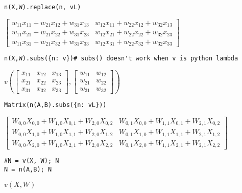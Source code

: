 \documentclass[
]{article}
\begin{document}
\begin{verbatim}
n(X,W).replace(n, vL)
\end{verbatim}

\(\displaystyle \left[\begin{matrix}w_{11} x_{11} + w_{21} x_{12} + w_{31} x_{13} & w_{12} x_{11} + w_{22} x_{12} + w_{32} x_{13}\\w_{11} x_{21} + w_{21} x_{22} + w_{31} x_{23} & w_{12} x_{21} + w_{22} x_{22} + w_{32} x_{23}\\w_{11} x_{31} + w_{21} x_{32} + w_{31} x_{33} & w_{12} x_{31} + w_{22} x_{32} + w_{32} x_{33}\end{matrix}\right]\)

\begin{verbatim}
n(X,W).subs({n: v})# subs() doesn't work when v is python lambda
\end{verbatim}

\(\displaystyle v{\left(\left[\begin{matrix}x_{11} & x_{12} & x_{13}\\x_{21} & x_{22} & x_{23}\\x_{31} & x_{32} & x_{33}\end{matrix}\right],\left[\begin{matrix}w_{11} & w_{12}\\w_{21} & w_{22}\\w_{31} & w_{32}\end{matrix}\right] \right)}\)

\begin{verbatim}
Matrix(n(A,B).subs({n: vL}))
\end{verbatim}

\(\displaystyle \left[\begin{array}{cc}W_{0, 0} X_{0, 0} + W_{1, 0} X_{0, 1} + W_{2, 0} X_{0, 2} & W_{0, 1} X_{0, 0} + W_{1, 1} X_{0, 1} + W_{2, 1} X_{0, 2}\\W_{0, 0} X_{1, 0} + W_{1, 0} X_{1, 1} + W_{2, 0} X_{1, 2} & W_{0, 1} X_{1, 0} + W_{1, 1} X_{1, 1} + W_{2, 1} X_{1, 2}\\W_{0, 0} X_{2, 0} + W_{1, 0} X_{2, 1} + W_{2, 0} X_{2, 2} & W_{0, 1} X_{2, 0} + W_{1, 1} X_{2, 1} + W_{2, 1} X_{2, 2}\end{array}\right]\)

\begin{verbatim}
#N = v(X, W); N
N = n(A,B); N
\end{verbatim}

\(\displaystyle v{\left(X,W \right)}\)
\end{document}
